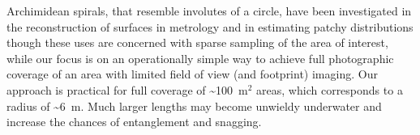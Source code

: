 Archimidean spirals, that resemble involutes of a circle, have been investigated in the reconstruction of surfaces in metrology \cite{Wieczorowski_2001} and in estimating patchy distributions \cite{Kalikhman_2006} though these uses are concerned with sparse sampling of the area of interest, while our focus is on an operationally simple way to achieve full photographic coverage of an area with limited field of view (and footprint) imaging. Our approach is practical for full coverage of \sim{100~m$^{2}$} areas, which corresponds to a radius of \sim{6~m}. Much larger lengths may become unwieldy underwater and increase the chances of entanglement and snagging.

  